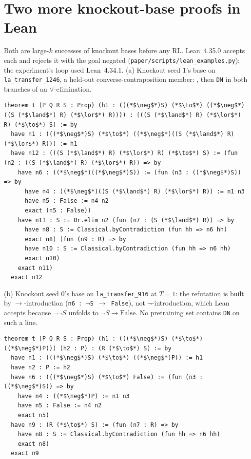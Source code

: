 \section{Two more knockout-base proofs in Lean}
\label{app:lean}
Both are large-$k$ successes of knockout bases before any RL. Lean~4.35.0 accepts each and rejects it with the goal
negated (\texttt{paper/scripts/lean\_examples.py}); the experiment's loop used Lean~4.34.1. (a) Knockout seed 1's base on \texttt{la\_transfer\_1246}, a held-out
converse-contraposition member: \sig{}, then \texttt{DN} in both branches of an $\lor$-elimination.
\begin{lstlisting}
theorem t (P Q R S : Prop) (h1 : (((*$\neg$*)S) (*$\to$*) ((*$\neg$*)((S (*$\land$*) R) (*$\lor$*) R)))) : (((S (*$\land$*) R) (*$\lor$*) R) (*$\to$*) S) := by
  have n1 : (((*$\neg$*)S) (*$\to$*) ((*$\neg$*)((S (*$\land$*) R) (*$\lor$*) R))) := h1
  have n12 : (((S (*$\land$*) R) (*$\lor$*) R) (*$\to$*) S) := (fun (n2 : ((S (*$\land$*) R) (*$\lor$*) R)) => by
    have n6 : ((*$\neg$*)((*$\neg$*)S)) := (fun (n3 : ((*$\neg$*)S)) => by
      have n4 : ((*$\neg$*)((S (*$\land$*) R) (*$\lor$*) R)) := n1 n3
      have n5 : False := n4 n2
      exact (n5 : False))
    have n11 : S := Or.elim n2 (fun (n7 : (S (*$\land$*) R)) => by
      have n8 : S := Classical.byContradiction (fun hh => n6 hh)
      exact n8) (fun (n9 : R) => by
      have n10 : S := Classical.byContradiction (fun hh => n6 hh)
      exact n10)
    exact n11)
  exact n12
\end{lstlisting}
(b) Knockout seed 0's base on \texttt{la\_transfer\_916} at $T=1$: the refutation is built by $\to$-introduction
(\texttt{n6 : $\neg$S $\to$ False}), not $\neg$-introduction, which Lean accepts because $\neg\neg S$ unfolds to
$\neg S \to \mathrm{False}$. No pretraining set contains \texttt{DN} on such a line.
\begin{lstlisting}
theorem t (P Q R S : Prop) (h1 : (((*$\neg$*)S) (*$\to$*) ((*$\neg$*)P))) (h2 : P) : (R (*$\to$*) S) := by
  have n1 : (((*$\neg$*)S) (*$\to$*) ((*$\neg$*)P)) := h1
  have n2 : P := h2
  have n6 : (((*$\neg$*)S) (*$\to$*) False) := (fun (n3 : ((*$\neg$*)S)) => by
    have n4 : ((*$\neg$*)P) := n1 n3
    have n5 : False := n4 n2
    exact n5)
  have n9 : (R (*$\to$*) S) := (fun (n7 : R) => by
    have n8 : S := Classical.byContradiction (fun hh => n6 hh)
    exact n8)
  exact n9
\end{lstlisting}

